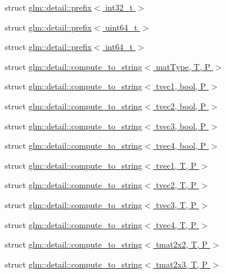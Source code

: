 \begin{DoxyCompactItemize}
struct \hyperlink{structglm_1_1detail_1_1prefix_3_01int32__t_01_4}{glm\+::detail\+::prefix$<$ int32\+\_\+t $>$}
\item 
struct \hyperlink{structglm_1_1detail_1_1prefix_3_01uint64__t_01_4}{glm\+::detail\+::prefix$<$ uint64\+\_\+t $>$}
\item 
struct \hyperlink{structglm_1_1detail_1_1prefix_3_01int64__t_01_4}{glm\+::detail\+::prefix$<$ int64\+\_\+t $>$}
\item 
struct \hyperlink{structglm_1_1detail_1_1compute__to__string}{glm\+::detail\+::compute\+\_\+to\+\_\+string$<$ mat\+Type, T, P $>$}
\item 
struct \hyperlink{structglm_1_1detail_1_1compute__to__string_3_01tvec1_00_01bool_00_01_p_01_4}{glm\+::detail\+::compute\+\_\+to\+\_\+string$<$ tvec1, bool, P $>$}
\item 
struct \hyperlink{structglm_1_1detail_1_1compute__to__string_3_01tvec2_00_01bool_00_01_p_01_4}{glm\+::detail\+::compute\+\_\+to\+\_\+string$<$ tvec2, bool, P $>$}
\item 
struct \hyperlink{structglm_1_1detail_1_1compute__to__string_3_01tvec3_00_01bool_00_01_p_01_4}{glm\+::detail\+::compute\+\_\+to\+\_\+string$<$ tvec3, bool, P $>$}
\item 
struct \hyperlink{structglm_1_1detail_1_1compute__to__string_3_01tvec4_00_01bool_00_01_p_01_4}{glm\+::detail\+::compute\+\_\+to\+\_\+string$<$ tvec4, bool, P $>$}
\item 
struct \hyperlink{structglm_1_1detail_1_1compute__to__string_3_01tvec1_00_01_t_00_01_p_01_4}{glm\+::detail\+::compute\+\_\+to\+\_\+string$<$ tvec1, T, P $>$}
\item 
struct \hyperlink{structglm_1_1detail_1_1compute__to__string_3_01tvec2_00_01_t_00_01_p_01_4}{glm\+::detail\+::compute\+\_\+to\+\_\+string$<$ tvec2, T, P $>$}
\item 
struct \hyperlink{structglm_1_1detail_1_1compute__to__string_3_01tvec3_00_01_t_00_01_p_01_4}{glm\+::detail\+::compute\+\_\+to\+\_\+string$<$ tvec3, T, P $>$}
\item 
struct \hyperlink{structglm_1_1detail_1_1compute__to__string_3_01tvec4_00_01_t_00_01_p_01_4}{glm\+::detail\+::compute\+\_\+to\+\_\+string$<$ tvec4, T, P $>$}
\item 
struct \hyperlink{structglm_1_1detail_1_1compute__to__string_3_01tmat2x2_00_01_t_00_01_p_01_4}{glm\+::detail\+::compute\+\_\+to\+\_\+string$<$ tmat2x2, T, P $>$}
\item 
struct \hyperlink{structglm_1_1detail_1_1compute__to__string_3_01tmat2x3_00_01_t_00_01_p_01_4}{glm\+::detail\+::compute\+\_\+to\+\_\+string$<$ tmat2x3, T, P $>$}

\end{DoxyCompactItemize}
